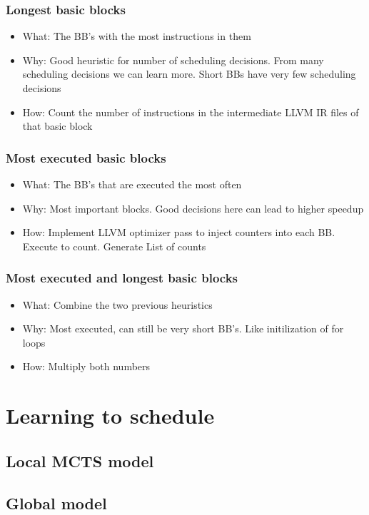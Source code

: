 \subsubsection{Longest basic blocks}
\begin{itemize}
    \item What: The BB's with the most instructions in them
    \item Why: Good heuristic for number of scheduling decisions. From many scheduling decisions we can learn more. Short BBs have very few scheduling decisions
    \item How: Count the number of instructions in the intermediate LLVM IR files of that basic block
\end{itemize}
\subsubsection{Most executed basic blocks}
\begin{itemize}
    \item What: The BB's that are executed the most often
    \item Why: Most important blocks. Good decisions here can lead to higher speedup
    \item How: Implement LLVM optimizer pass to inject counters into each BB. Execute to count. Generate List of counts
\end{itemize}
\subsubsection{Most executed and longest basic blocks}
\begin{itemize}
    \item What: Combine the two previous heuristics
    \item Why: Most executed, can still be very short BB's. Like initilization of for loops
    \item How: Multiply both numbers
\end{itemize}

\section{Learning to schedule}
\subsection{Local MCTS model}
\label{subsec:approach:ml:mcts}
\subsection{Global model}
\label{subsec:approach:ml:global}

